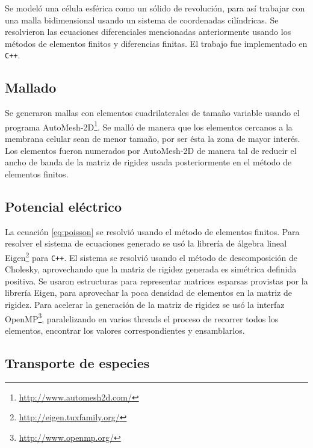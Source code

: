 \documentclass[a4paper,10pt]{article}
\begin{document}
Se modeló una célula esférica como un sólido de revolución, para así trabajar con una malla bidimensional usando un sistema de coordenadas cilíndricas. Se resolvieron las ecuaciones diferenciales mencionadas anteriormente usando los métodos de elementos finitos y diferencias finitas. El trabajo fue implementado en \texttt{C++}.


\subsection{Mallado}
Se generaron mallas con elementos cuadrilaterales de tamaño variable usando el programa AutoMesh-2D\footnote{\href{http://www.automesh2d.com/}{http://www.automesh2d.com/}}. Se malló de manera que los elementos cercanos a la membrana celular sean de menor tamaño, por ser ésta la zona de mayor interés. Los elementos fueron numerados por AutoMesh-2D de manera tal de reducir el ancho de banda de la matriz de rigidez usada posteriormente en el método de elementos finitos. \\


\subsection{Potencial eléctrico}

La ecuación \ref{eq:poisson} se resolvió usando el método de elementos finitos. Para resolver el sistema de ecuaciones generado se usó la librería de álgebra lineal Eigen\footnote{\href{http://eigen.tuxfamily.org/}{http://eigen.tuxfamily.org/}} para \texttt{C++}. El sistema se resolvió usando el método de descomposición de Cholesky, aprovechando que la matriz de rigidez generada es simétrica definida positiva. Se usaron estructuras para representar matrices esparsas provistas por la librería Eigen, para aprovechar la poca densidad de elementos en la matriz de rigidez. Para acelerar la generación de la matriz de rigidez se usó la interfaz OpenMP\footnote{\href{http://www.openmp.org/}{http://www.openmp.org/}}, paralelizando en varios threads el proceso de recorrer todos los elementos, encontrar los valores correspondientes y ensamblarlos.\\


\subsection{Transporte de especies}
\end{document}
